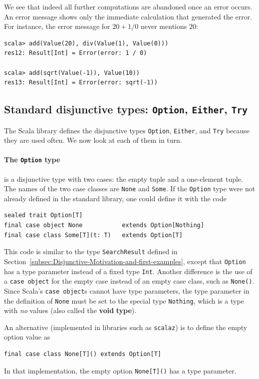 We see that indeed all further computations are abandoned once an
error occurs. An error message shows only the immediate calculation
that generated the error. For instance, the error message for $20+1/0$
never mentions $20$:
\begin{lstlisting}
scala> add(Value(20), div(Value(1), Value(0)))
res12: Result[Int] = Error(error: 1 / 0)

scala> add(sqrt(Value(-1)), Value(10))
res13: Result[Int] = Error(error: sqrt(-1))
\end{lstlisting}


\subsection{Standard disjunctive types: \texttt{Option}, \texttt{Either}, \texttt{Try}}

The Scala library defines the disjunctive types \lstinline!Option!,
\lstinline!Either!, and \lstinline!Try! because they are used often.
We now look at each of them in turn.

\paragraph{The \texttt{Option} type}

is a disjunctive type with two cases: the empty tuple and a one-element
tuple. The names of the two case classes are \lstinline!None! and
\lstinline!Some!. If the \lstinline!Option! type were not already
defined in the standard library, one could define it with the code
\begin{lstlisting}
sealed trait Option[T]
final case object None           extends Option[Nothing]
final case class Some[T](t: T)   extends Option[T]
\end{lstlisting}
This code is similar to the type \lstinline!SearchResult! defined
in Section~\ref{subsec:Disjunctive-Motivation-and-first-examples},
except that \lstinline!Option! has a type parameter instead of a
fixed type \lstinline!Int!. Another difference is the use of a \lstinline!case object!
for the empty case instead of an empty case class, such as \lstinline!None()!.
Since Scala\textsf{'}s \lstinline!case object!s cannot have type parameters,
the type parameter in the definition of \lstinline!None! must be
set to the special type \lstinline!Nothing!, which is a type with
\emph{no} values (also called the \textbf{void} \textbf{type}).

An alternative (implemented in libraries such as \texttt{scalaz})
is to define the empty option value as
\begin{lstlisting}
final case class None[T]() extends Option[T]
\end{lstlisting}
In that implementation, the empty option \lstinline!None[T]()! has
a type parameter.

